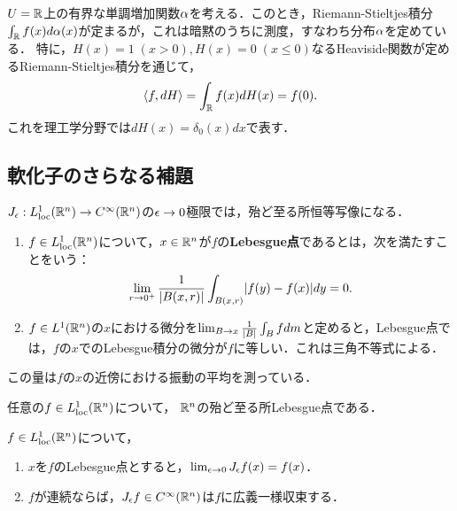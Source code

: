 \documentclass[uplatex,dvipdfmx]{jsreport}
\begin{document}
\begin{example}[累積分布関数の消息]
    $U=\mathbb{R}$上の有界な単調増加関数$\alpha$を考える．このとき，Riemann-Stieltjes積分$\int_{\mathbb{R}} f(x)d\alpha(x)$が定まるが，これは暗黙のうちに測度，すなわち分布$\alpha$を定めている．
    特に，$H(x)=1\;(x>0),H(x)=0\;(x\le0)$なるHeaviside関数が定めるRiemann-Stieltjes積分を通じて，
    \[\langle f,dH\rangle=\int_{\mathbb{R}} f(x)dH(x)=f(0).\]
    これを理工学分野では$dH(x)=\delta_0(x)dx$で表す．
\end{example}

\subsection{軟化子のさらなる補題}

\begin{tcolorbox}[colframe=ForestGreen, colback=ForestGreen!10!white,breakable,colbacktitle=ForestGreen!40!white,coltitle=black,fonttitle=\bfseries\sffamily,
title=]
    $J_\epsilon:L^1_{\mathrm{loc}}(\mathbb{R}^n)\to C^\infty(\mathbb{R}^n)$の$\epsilon\to0$極限では，殆ど至る所恒等写像になる．
\end{tcolorbox}

\begin{definition}\mbox{}
    \begin{enumerate}
        \item $f\in L^1_{\mathrm{loc}}(\mathbb{R}^n)$について，$x\in\mathbb{R}^n$が$f$の\textbf{Lebesgue点}であるとは，次を満たすことをいう：
        \[\lim_{r\to0^+}\frac{1}{\lvert B(x,r)\rvert}\int_{B(x,r)}\lvert f(y)-f(x)\rvert dy=0.\]
        \item $f\in L^1(\mathbb{R}^n)$の$x$における微分を$\lim_{B\to x}\frac{1}{\lvert B\rvert}\int_Bfdm$と定めると，Lebesgue点では，$f$の$x$でのLebesgue積分の微分が$f$に等しい．これは三角不等式による．
    \end{enumerate}
\end{definition}
\begin{remarks}
    この量は$f$の$x$の近傍における振動の平均を測っている．
\end{remarks}

\begin{theorem}
    任意の$f\in L^1_{\mathrm{loc}}(\mathbb{R}^n)$について，
    $\mathbb{R}^n$の殆ど至る所Lebesgue点である．
\end{theorem}

\begin{theorem}
    $f\in L^1_{\mathrm{loc}}(\mathbb{R}^n)$について，
    \begin{enumerate}
        \item $x$を$f$のLebesgue点とすると，$\lim_{\epsilon\to0}J_\epsilon f(x)=f(x)$．
        \item $f$が連続ならば，$J_\epsilon f\in C^\infty(\mathbb{R}^n)$は$f$に広義一様収束する．
    \end{enumerate}
\end{theorem}
\end{document}
